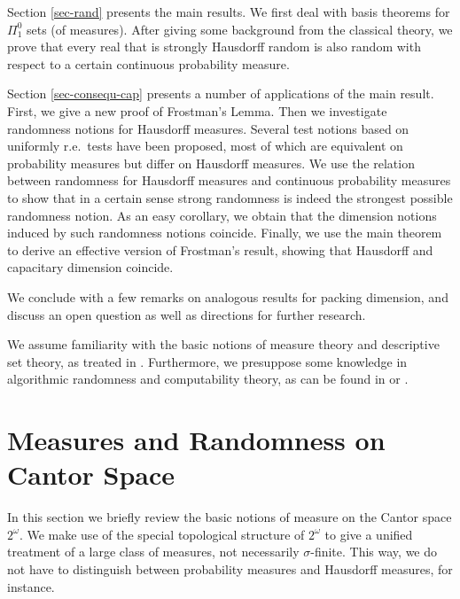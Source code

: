 \documentclass[11pt,reqno]{article}
\theoremstyle{plain}
\theoremstyle{definition}
\theoremstyle{remark}
\numberwithin{equation}{section}
\newcommand{\Cant}{\ensuremath{2^{\omega}}}
\begin{document}
Section \ref{sec-rand} presents the main results. We first deal with basis theorems for $\Pi^0_1$ sets (of measures). After giving some background from the classical theory, we prove that every real that is strongly Hausdorff random is also random with respect to a certain continuous probability measure. 

Section \ref{sec-consequ-cap} presents a number of applications of the main result. First, we give a new proof of Frostman's Lemma. Then we investigate randomness notions for Hausdorff measures. Several test notions based on uniformly r.e.\ tests have been proposed, most of which are equivalent on probability measures but differ on Hausdorff measures. We use the relation between randomness for Hausdorff measures and continuous probability measures to show that in a certain sense strong randomness is indeed the strongest possible randomness notion.  
As an easy corollary, we obtain that the dimension notions induced by such randomness notions coincide.
Finally, we use the main theorem to derive an effective version of Frostman's result, showing that Hausdorff and capacitary dimension coincide. 

We conclude with a few remarks on analogous results for packing dimension, and discuss an open question as well as directions for further research.

We assume familiarity with the basic notions of measure theory and descriptive set theory, as treated in \citep{kechris:1995}. Furthermore, we presuppose some knowledge in algorithmic randomness and computability theory, as can be found in \citep{li-vitanyi:1997} or \citep{downey-hirschfeldt:ip}. 




% 
% 
\section{Measures and Randomness on Cantor Space} \label{sec-meas-top-cant}

In this section we briefly review the basic notions of measure on the Cantor space $\Cant$. We make use of the special topological structure of $\Cant$ to give a unified treatment of a large class of measures, not necessarily $\sigma$-finite. 
This way, we do not have to distinguish between probability measures and Hausdorff measures, for instance.
\end{document}
